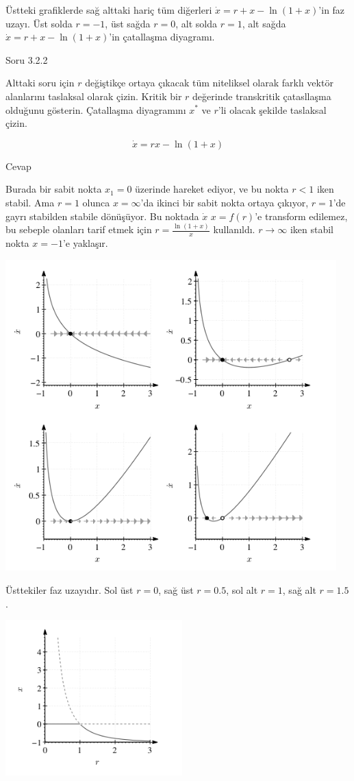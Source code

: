 \documentclass[12pt,fleqn]{article}\usepackage{../../common}
\begin{document}
Üstteki grafiklerde sağ alttaki hariç tüm diğerleri $\dot{x} = r+x-\ln(1+x)$'in
faz uzayı. Üst solda $r=-1$, üst sağda $r=0$, alt solda $r=1$, alt sağda
$\dot{x} = r+x-\ln(1+x)$'in çatallaşma diyagramı. 

Soru 3.2.2

Alttaki soru için $r$ değiştikçe ortaya çıkacak tüm niteliksel olarak farklı
vektör alanlarını taslaksal olarak çizin. Kritik bir $r$ değerinde transkritik
çatasllaşma olduğunu gösterin. Çatallaşma diyagramını $x^\ast$ ve $r$'li olacak şekilde
taslaksal çizin.

$$ \dot{x} = rx - \ln(1+x) $$

Cevap

Burada bir sabit nokta $x_1=0$ üzerinde hareket ediyor, ve bu nokta $r<1$ iken
stabil. Ama $r=1$ olunca $x=\infty$'da ikinci bir sabit nokta ortaya çıkıyor,
$r=1$'de gayrı stabilden stabile dönüşüyor. Bu noktada $\dot{x}$ $x=f(r)$'e
transform edilemez, bu sebeple olanları tarif etmek için $r =\frac{\ln(1+x)}{x}$
kullanıldı. $r\to\infty$ iken stabil nokta $x=-1$'e yaklaşır.


\includegraphics[height=12cm]{08_02.png}

Üsttekiler faz uzayıdır. Sol üst $r=0$, sağ üst $r=0.5$, sol alt $r=1$, sağ alt
$r=1.5$.

\includegraphics[height=6cm]{08_03.png}
\end{document}
